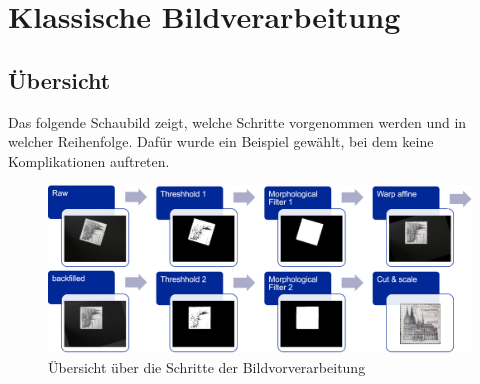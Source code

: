 \documentclass[12pt,toc=bib,toc=listof]{scrreprt}
\begin{document}

\chapter{Klassische Bildverarbeitung} %
\label{sec:klass_bv}

\section{Übersicht}
\label{sec_bv:übersicht}
Das folgende Schaubild zeigt, welche Schritte vorgenommen werden und in welcher Reihenfolge. Dafür wurde ein Beispiel gewählt, bei dem keine Komplikationen auftreten.
\begin{figure}[h]
\includegraphics[width=\textwidth]{./bilder/bv_overview.png}
\caption{Übersicht über die Schritte der Bildvorverarbeitung}
\label{fig:bv_overview}
\end{figure}
\end{document}
